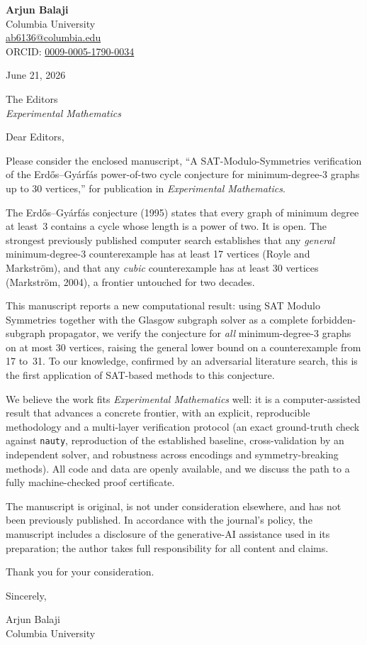\documentclass[11pt]{article}
\begin{document}
\noindent
{\large\textbf{Arjun Balaji}}\\
Columbia University\\
\href{mailto:ab6136@columbia.edu}{ab6136@columbia.edu}\\
ORCID: \href{https://orcid.org/0009-0005-1790-0034}{0009-0005-1790-0034}

\vspace{1.5em}
\noindent June 21, 2026

\vspace{1.5em}
\noindent
The Editors\\
\emph{Experimental Mathematics}

\vspace{1.5em}
\noindent Dear Editors,

\medskip
Please consider the enclosed manuscript, ``A SAT-Modulo-Symmetries verification of
the Erd\H{o}s--Gy\'arf\'as power-of-two cycle conjecture for minimum-degree-3 graphs
up to 30 vertices,'' for publication in \emph{Experimental Mathematics}.

The Erd\H{o}s--Gy\'arf\'as conjecture (1995) states that every graph of minimum
degree at least~3 contains a cycle whose length is a power of two. It is open. The
strongest previously published computer search establishes that any \emph{general}
minimum-degree-3 counterexample has at least 17 vertices (Royle and Markstr\"om),
and that any \emph{cubic} counterexample has at least 30 vertices (Markstr\"om,
2004), a frontier untouched for two decades.

This manuscript reports a new computational result: using SAT Modulo Symmetries
together with the Glasgow subgraph solver as a complete forbidden-subgraph
propagator, we verify the conjecture for \emph{all} minimum-degree-3 graphs on at
most 30 vertices, raising the general lower bound on a counterexample from 17 to~31.
To our knowledge, confirmed by an adversarial literature search, this is the first
application of SAT-based methods to this conjecture.

We believe the work fits \emph{Experimental Mathematics} well: it is a
computer-assisted result that advances a concrete frontier, with an explicit,
reproducible methodology and a multi-layer verification protocol (an exact
ground-truth check against \texttt{nauty}, reproduction of the established baseline,
cross-validation by an independent solver, and robustness across encodings and
symmetry-breaking methods). All code and data are openly available, and we discuss
the path to a fully machine-checked proof certificate.

The manuscript is original, is not under consideration elsewhere, and has not been
previously published. In accordance with the journal's policy, the manuscript
includes a disclosure of the generative-AI assistance used in its preparation; the
author takes full responsibility for all content and claims.

Thank you for your consideration.

\vspace{1.5em}
\noindent
Sincerely,

\vspace{2.5em}
\noindent
Arjun Balaji\\
Columbia University
\end{document}
